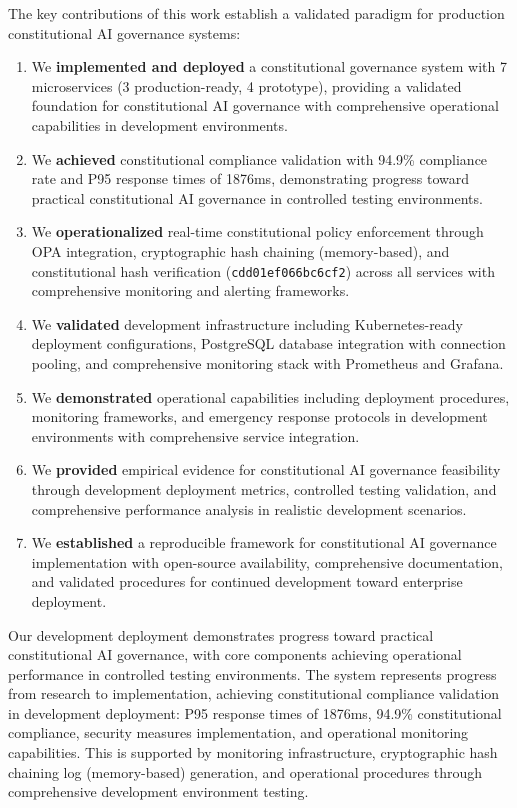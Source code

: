 \documentclass[manuscript,screen,9pt]{acmart}
\begin{document}
The key contributions of this work establish a validated paradigm for production constitutional AI governance systems:
\begin{enumerate}[leftmargin=*,itemsep=2pt,parsep=1pt]
    \item We \textbf{implemented and deployed} a constitutional governance system with 7 microservices (3 production-ready, 4 prototype), providing a validated foundation for constitutional AI governance with comprehensive operational capabilities in development environments.
    \item We \textbf{achieved} constitutional compliance validation with 94.9\% compliance rate and P95 response times of 1876ms, demonstrating progress toward practical constitutional AI governance in controlled testing environments.
    \item We \textbf{operationalized} real-time constitutional policy enforcement through OPA integration, cryptographic hash chaining (memory-based), and constitutional hash verification (\texttt{cdd01ef066bc6cf2}) across all services with comprehensive monitoring and alerting frameworks.
    \item We \textbf{validated} development infrastructure including Kubernetes-ready deployment configurations, PostgreSQL database integration with connection pooling, and comprehensive monitoring stack with Prometheus and Grafana.
    \item We \textbf{demonstrated} operational capabilities including deployment procedures, monitoring frameworks, and emergency response protocols in development environments with comprehensive service integration.
    \item We \textbf{provided} empirical evidence for constitutional AI governance feasibility through development deployment metrics, controlled testing validation, and comprehensive performance analysis in realistic development scenarios.
    \item We \textbf{established} a reproducible framework for constitutional AI governance implementation with open-source availability, comprehensive documentation, and validated procedures for continued development toward enterprise deployment.
\end{enumerate}

Our development deployment demonstrates progress toward practical constitutional AI governance, with core components achieving operational performance in controlled testing environments. The system represents progress from research to implementation, achieving constitutional compliance validation in development deployment: P95 response times of 1876ms, 94.9\% constitutional compliance, security measures implementation, and operational monitoring capabilities. This is supported by monitoring infrastructure, cryptographic hash chaining log (memory-based) generation, and operational procedures through comprehensive development environment testing.
\end{document}
